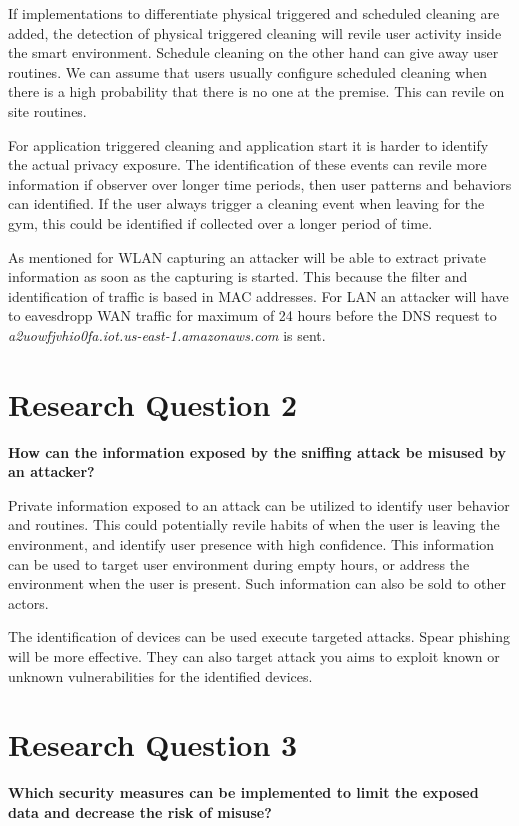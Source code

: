 If implementations to differentiate physical triggered and scheduled cleaning are added, the detection of physical triggered cleaning will revile user activity inside the smart environment. Schedule cleaning on the other hand can give away user routines. We can assume that users usually configure scheduled cleaning when there is a high probability that there is no one at the premise. This can revile on site routines. 

For application triggered cleaning and application start it is harder to identify the actual privacy exposure. The identification of these events can revile more information if observer over longer time periods, then user patterns and behaviors can identified. If the user always trigger a cleaning event when leaving for the gym, this could be identified if collected over a longer period of time. 

As mentioned for WLAN capturing an attacker will be able to extract private information as soon as the capturing is started. This because the filter and identification of traffic is based in MAC addresses. For LAN an attacker will have to eavesdropp WAN traffic for maximum of 24 hours before the DNS request to \textit{a2uowfjvhio0fa.iot.us-east-1.amazonaws.com} is sent. 

\section{Research Question  2}
\textbf{How can the information exposed by the sniffing attack be misused by an attacker?} 

Private information exposed to an attack can be utilized to identify user behavior and routines. This could potentially revile habits of when the user is leaving the environment, and identify user presence with high confidence. This information can be used to target user environment during empty hours, or address the environment when the user is present. Such information can also be sold to other actors. 

The identification of devices can be used execute targeted attacks. Spear phishing \cite{spear_phishing} will be more effective. They can also target attack you aims to exploit known or unknown vulnerabilities for the identified devices.  

\section{Research Question  3}
\textbf{Which security measures can be implemented to limit the exposed data and decrease the risk of misuse?} 

